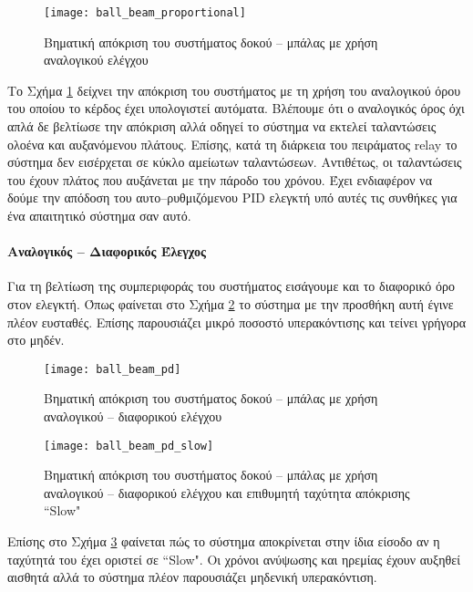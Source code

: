 \begin{figure}[h]
  \centering
  \texttt{[image: ball\_beam\_proportional]}
  \caption{Βηματική απόκριση του συστήματος δοκού -- μπάλας με χρήση αναλογικού ελέγχου}
  \label{fig:ball_beam_proportional}
\end{figure}

Το Σχήμα \ref{fig:ball_beam_proportional} δείχνει την απόκριση του συστήματος με τη χρήση του αναλογικού όρου του οποίου το κέρδος έχει υπολογιστεί αυτόματα. Βλέπουμε ότι ο αναλογικός όρος όχι απλά δε βελτίωσε την απόκριση αλλά οδηγεί το σύστημα να εκτελεί ταλαντώσεις ολοένα και αυξανόμενου πλάτους. Επίσης, κατά τη διάρκεια του πειράματος relay το σύστημα δεν εισέρχεται σε κύκλο αμείωτων ταλαντώσεων. Αντιθέτως, οι ταλαντώσεις του έχουν πλάτος που αυξάνεται με την πάροδο του χρόνου. Έχει ενδιαφέρον να δούμε την απόδοση του αυτο--ρυθμιζόμενου PID ελεγκτή υπό αυτές τις συνθήκες για ένα απαιτητικό σύστημα σαν αυτό.



\paragraph{Αναλογικός -- Διαφορικός Έλεγχος}\hfill

Για τη βελτίωση της συμπεριφοράς του συστήματος εισάγουμε και το διαφορικό όρο στον ελεγκτή. Όπως φαίνεται στο Σχήμα \ref{fig:ball_beam_pd} το σύστημα με την προσθήκη αυτή έγινε πλέον ευσταθές. Επίσης παρουσιάζει μικρό ποσοστό υπερακόντισης και τείνει γρήγορα στο μηδέν.

\begin{figure}[h]
  \centering
  \texttt{[image: ball\_beam\_pd]}
  \caption{Βηματική απόκριση του συστήματος δοκού -- μπάλας με χρήση αναλογικού -- διαφορικού ελέγχου}
  \label{fig:ball_beam_pd}
\end{figure}

\begin{figure}[h]
  \centering
  \texttt{[image: ball\_beam\_pd\_slow]}
  \caption{Βηματική απόκριση του συστήματος δοκού -- μπάλας με χρήση αναλογικού -- διαφορικού ελέγχου και επιθυμητή ταχύτητα απόκρισης ``Slow"}
  \label{fig:ball_beam_pd_slow}
\end{figure}

Επίσης στο Σχήμα \ref{fig:ball_beam_pd_slow} φαίνεται πώς το σύστημα αποκρίνεται στην ίδια είσοδο αν η ταχύτητά του έχει οριστεί σε ``Slow". Οι χρόνοι ανύψωσης και ηρεμίας έχουν αυξηθεί αισθητά αλλά το σύστημα πλέον παρουσιάζει μηδενική υπερακόντιση.

